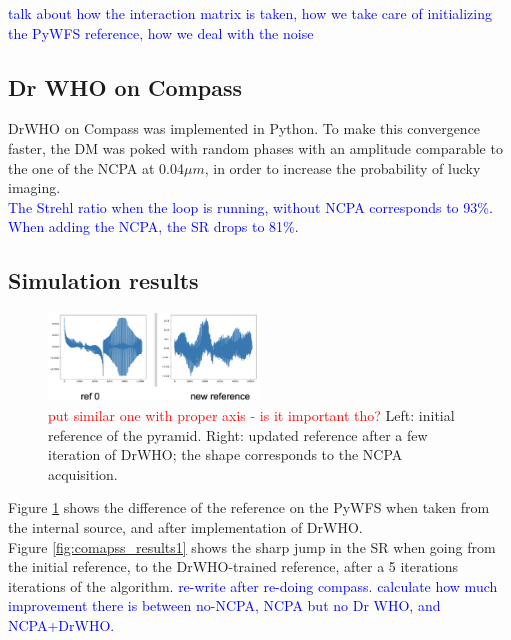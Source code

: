 \documentclass[twocolumn]{aastex62}
\begin{document}
\textcolor{blue}{talk about how the interaction matrix is taken, how we take care of initializing the PyWFS reference, how we deal with the noise}

 

\subsection{Dr WHO on Compass}

DrWHO on Compass was implemented in Python. To make this convergence faster, the DM was poked with random phases with an amplitude comparable to the one of the NCPA at 0.04$\mu m$, in order to increase the probability of lucky imaging. \\
\textcolor{blue}{The Strehl ratio when the loop is running, without NCPA corresponds to 93\%. When adding the NCPA, the SR drops to 81\%. }



\subsection{Simulation results}

\begin{figure}[ht!]
\begin{center}
\includegraphics[width=0.5\textwidth]{fig/compass_ref.png}
\caption{\textcolor{red}{put similar one with proper axis - is it important tho?} Left: initial reference of the pyramid. Right: updated reference after a few iteration of DrWHO; the shape corresponds to the NCPA acquisition. }
\label{fig:refpyramide}
\end{center}
\end{figure}

Figure \ref{fig:refpyramide} shows the difference of the reference on the PyWFS when taken from the internal source, and after implementation of DrWHO. \\

Figure \ref{fig:comapss_results1} shows the sharp jump in the SR when going from the initial reference, to the DrWHO-trained reference, after a 5 iterations iterations of the algorithm. \textcolor{blue}{re-write after re-doing compass. calculate how much improvement there is between no-NCPA, NCPA but no Dr WHO, and NCPA+DrWHO.}
\end{document}
